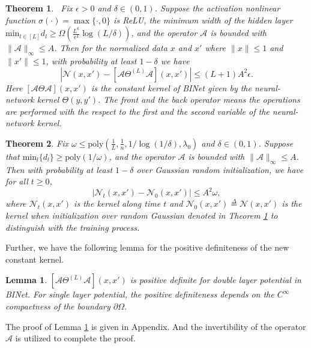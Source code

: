 \documentclass[hyperref]{article}
\numberwithin{equation}{section}
\theoremstyle{nonumberplain}
\newtheorem{theorem}{Theorem}[section]
\newtheorem{lemma}{Lemma}[section]
\begin{document}
	\begin{theorem}\
		Fix $\epsilon>0$ and $\delta\in(0,1)$. Suppose the activation nonlinear function $\sigma(\cdot) = \max\{\cdot,0\}$ is ReLU, the minimum width of the hidden layer $\text{min}_{l\in[L]}d_l\geq \Omega(\frac{L^6}{\epsilon^4}\log(L/\delta))$, and the operator $\mathcal{A}$ is bounded with $\|\mathcal{A}\|_\infty\leq A$. Then for the normalized data $x$ and $x'$ where $\|x\|\leq1$ and $\|x'\|\leq1$, with probability at least $1-\delta$
		we have $$|\mathcal{N}(x,x')-[\mathcal{A}\Theta^{(L)}\mathcal{A}](x,x')|\leq (L+1)A^2\epsilon.$$
		Here $[\mathcal{A}\Theta\mathcal{A}](x,x')$ is the constant kernel of BINet given by the neural-network kernel $\Theta(y,y')$. The front and the back operator means the operations are performed with the respect to the first and the second variable of the neural-network kernel. 
		\label{th.c1}
	\end{theorem}
	
	\begin{theorem}
		Fix $\omega\leq \text{poly}(\frac{1}{L}, \frac{1}{n}, 1/\log(1/\delta), \lambda_0)$ and $\delta\in(0,1)$. Suppose that $\text{min}_l \{d_l\}\geq \text{poly}(1/\omega)$, and the operator $\mathcal{A}$ is bounded with $\|\mathcal{A}\|_\infty\leq A$. Then with probability at least $1-\delta$ over Gaussian random initialization, we have for all $t\geq 0$, $$|\mathcal{N}_t(x,x')-\mathcal{N}_0(x,x')|\leq A^2\omega,$$
		where $\mathcal{N}_t(x,x')$ is the kernel along time $t$ and $\mathcal{N}_0(x,x')\overset{\Delta}{=}\mathcal{N}(x,x')$ is the kernel when initialization over random Gaussian denoted in Theorem \ref{th.c1} to distinguish with the training process.
		\label{th.c2}
	\end{theorem}
	
	Further, we have the following lemma for the positive definiteness of the new constant kernel.
	\begin{lemma}\label{lemma.definite}
		$[\mathcal{A}\Theta^{(L)}\mathcal{A}](x,x')$ is positive definite for double layer potential in BINet. For single layer potential, the positive definiteness depends on the $C^\infty$ compactness of the boundary $\partial\Omega$.
	\end{lemma}
	The proof of Lemma \ref{lemma.definite} is given in Appendix. And the invertibility of the operator $\mathcal{A}$ is utilized to complete the proof. \cite{gao1991layer, verchota1984layer}
	
\end{document}
